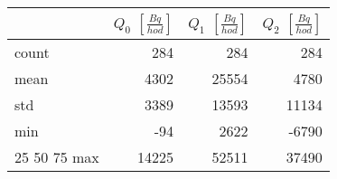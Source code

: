 \begin{tabular}{lrrr}
\toprule
{} &  $Q_0$ $\left[\si{\frac{Bq}{hod}}\right]$ &  $Q_1$ $\left[\si{\frac{Bq}{hod}}\right]$ &  $Q_2$ $\left[\si{\frac{Bq}{hod}}\right]$ \\
\midrule
count &                                       284 &                                       284 &                                       284 \\
mean  &                                      4302 &                                     25554 &                                      4780 \\
std   &                                      3389 &                                     13593 &                                     11134 \\
min   &                                       -94 &                                      2622 &                                     -6790 \\
25%
50%
75%
max   &                                     14225 &                                     52511 &                                     37490 \\
\bottomrule
\end{tabular}
